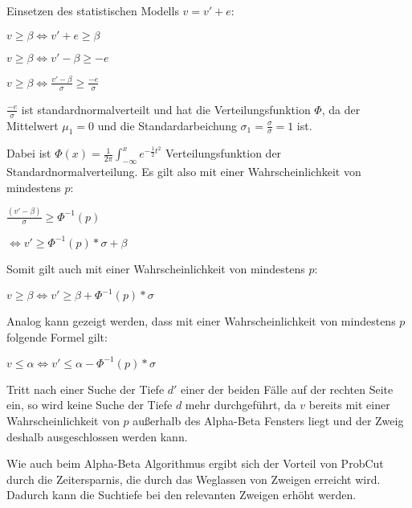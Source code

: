 Einsetzen des statistischen Modells $v=v'+e$:

\hspace*{1.3cm}
$v\geq\beta\iff v'+e\geq\beta$

\hspace*{1.3cm}
$v\geq\beta\iff v'-\beta\geq -e$

\hspace*{1.3cm}
$v\geq\beta\iff \frac{v'-\beta}{\sigma}\geq \frac{-e}{\sigma}$

$\frac{-e}{\sigma}$ ist standardnormalverteilt und hat die Verteilungsfunktion $\Phi$, da der Mittelwert $\mu_1=0$ und
die Standardarbeichung $\sigma_1=\frac{\sigma}{\sigma}=1$ ist.

Dabei ist $\Phi(x)=\frac{1}{2\pi}\int_{-\infty}^xe^{-\frac{1}{2}t^2}$ Verteilungsfunktion der Standardnormalverteilung.
Es gilt also mit einer Wahrscheinlichkeit von mindestens $p$:

\hspace*{1.3cm}
$\frac{(v'-\beta)}{\sigma}\geq\Phi^{-1}(p)$

\hspace*{1.3cm}
$\iff v'\geq\Phi^{-1}(p)*\sigma+\beta$

Somit gilt auch mit einer Wahrscheinlichkeit von mindestens $p$:

\hspace*{1.3cm}
\(v\geq\beta \iff v'\geq\beta+\Phi^{-1}(p)*\sigma\)

Analog kann gezeigt werden, dass mit einer Wahrscheinlichkeit von mindestens $p$ folgende Formel gilt:

\hspace*{1.3cm}
\(v\leq\alpha \iff v'\leq\alpha-\Phi^{-1}(p)*\sigma\)


Tritt nach einer Suche der Tiefe \(d'\) einer der beiden Fälle auf der rechten Seite ein, so wird keine Suche der Tiefe
\(d\) mehr durchgeführt, da \(v\) bereits mit einer Wahrscheinlichkeit von \(p\) außerhalb des Alpha-Beta Fensters liegt
und der Zweig deshalb ausgeschlossen werden kann.

Wie auch beim Alpha-Beta Algorithmus ergibt sich der Vorteil von ProbCut durch die Zeitersparnis, die durch das
Weglassen von Zweigen erreicht wird. Dadurch kann die Suchtiefe bei den relevanten Zweigen erhöht werden.
\cite[S.~1]{probcut}
